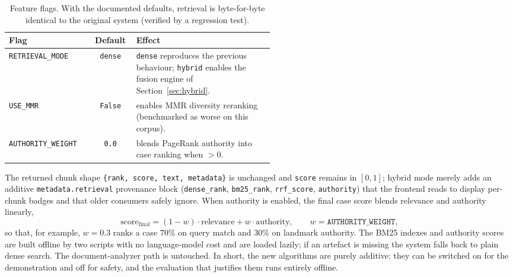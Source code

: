 \begin{table}[ht]
  \centering
  \caption{Feature flags. With the documented defaults, retrieval is byte-for-byte identical to
  the original system (verified by a regression test).}
  \label{tab:flags}
  \begin{tabular}{lcp{0.52\linewidth}}
    \toprule
    \textbf{Flag} & \textbf{Default} & \textbf{Effect} \\
    \midrule
    \texttt{RETRIEVAL\_MODE}  & \texttt{dense} & \texttt{dense} reproduces the previous behaviour; \texttt{hybrid} enables the fusion engine of Section~\ref{sec:hybrid}. \\
    \texttt{USE\_MMR}         & \texttt{False} & enables MMR diversity reranking (benchmarked as worse on this corpus). \\
    \texttt{AUTHORITY\_WEIGHT}& \texttt{0.0}   & blends PageRank authority into case ranking when $> 0$. \\
    \bottomrule
  \end{tabular}
\end{table}

The returned chunk shape \texttt{\{rank, score, text, metadata\}} is unchanged and \texttt{score}
remains in $[0,1]$; hybrid mode merely adds an additive
\texttt{metadata.retrieval} provenance block (\texttt{dense\_rank}, \texttt{bm25\_rank},
\texttt{rrf\_score}, \texttt{authority}) that the frontend reads to display per-chunk badges and
that older consumers safely ignore. When authority is enabled, the final case score blends
relevance and authority linearly,
\begin{equation}
\text{score}_{\text{final}} = (1 - w)\cdot \text{relevance} + w \cdot \text{authority},
\qquad w = \texttt{AUTHORITY\_WEIGHT},
\end{equation}
so that, for example, $w = 0.3$ ranks a case $70\%$ on query match and $30\%$ on landmark
authority. The BM25 indexes and authority scores are built offline by two scripts with no
language-model cost and are loaded lazily; if an artefact is missing the system falls back to
plain dense search. The document-analyzer path is untouched. In short, the new algorithms are
purely additive: they can be switched on for the demonstration and off for safety, and the
evaluation that justifies them runs entirely offline.

% 
% 
